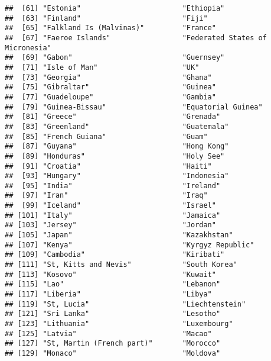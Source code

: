 \documentclass[
]{article}
\begin{document}
\begin{verbatim}
##  [61] "Estonia"                        "Ethiopia"                      
##  [63] "Finland"                        "Fiji"                          
##  [65] "Falkland Is (Malvinas)"         "France"                        
##  [67] "Faeroe Islands"                 "Federated States of Micronesia"
##  [69] "Gabon"                          "Guernsey"                      
##  [71] "Isle of Man"                    "UK"                            
##  [73] "Georgia"                        "Ghana"                         
##  [75] "Gibraltar"                      "Guinea"                        
##  [77] "Guadeloupe"                     "Gambia"                        
##  [79] "Guinea-Bissau"                  "Equatorial Guinea"             
##  [81] "Greece"                         "Grenada"                       
##  [83] "Greenland"                      "Guatemala"                     
##  [85] "French Guiana"                  "Guam"                          
##  [87] "Guyana"                         "Hong Kong"                     
##  [89] "Honduras"                       "Holy See"                      
##  [91] "Croatia"                        "Haiti"                         
##  [93] "Hungary"                        "Indonesia"                     
##  [95] "India"                          "Ireland"                       
##  [97] "Iran"                           "Iraq"                          
##  [99] "Iceland"                        "Israel"                        
## [101] "Italy"                          "Jamaica"                       
## [103] "Jersey"                         "Jordan"                        
## [105] "Japan"                          "Kazakhstan"                    
## [107] "Kenya"                          "Kyrgyz Republic"               
## [109] "Cambodia"                       "Kiribati"                      
## [111] "St, Kitts and Nevis"            "South Korea"                   
## [113] "Kosovo"                         "Kuwait"                        
## [115] "Lao"                            "Lebanon"                       
## [117] "Liberia"                        "Libya"                         
## [119] "St, Lucia"                      "Liechtenstein"                 
## [121] "Sri Lanka"                      "Lesotho"                       
## [123] "Lithuania"                      "Luxembourg"                    
## [125] "Latvia"                         "Macao"                         
## [127] "St, Martin (French part)"       "Morocco"                       
## [129] "Monaco"                         "Moldova"                       

\end{verbatim}
\end{document}
